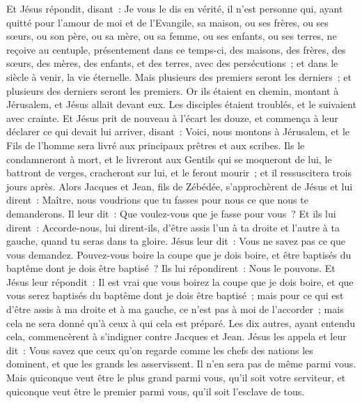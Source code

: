 \begin{multicols}{2}
Et Jésus répondit, disant~: Je vous le dis en vérité, il n'est personne qui, ayant quitté pour l'amour de moi et de l'Evangile, sa maison, ou ses frères, ou ses sœurs, ou son père, ou sa mère, ou sa femme, ou ses enfants, ou ses terres,
ne reçoive au centuple, présentement dans ce temps-ci, des maisons, des frères, des sœurs, des mères, des enfants, et des terres, avec des persécutions~; et dans le siècle à venir, la vie éternelle.
Mais plusieurs des premiers seront les derniers~; et plusieurs des derniers seront les premiers.
Or ils étaient en chemin, montant à Jérusalem, et Jésus allait devant eux. Les disciples étaient troublés, et le suivaient avec crainte. Et Jésus prit de nouveau à l'écart les douze, et commença à leur déclarer ce qui devait lui arriver,
disant~: Voici, nous montons à Jérusalem, et le Fils de l'homme sera livré aux principaux prêtres et aux scribes. Ils le condamneront à mort, et le livreront aux Gentils
qui se moqueront de lui, le battront de verges, cracheront sur lui, et le feront mourir~; et il ressuscitera trois jours après.
Alors Jacques et Jean, fils de Zébédée, s'approchèrent de Jésus et lui dirent~: Maître, nous voudrions que tu fasses pour nous ce que nous te demanderons.
Il leur dit~: Que voulez-vous que je fasse pour vous~?
Et ils lui dirent~: Accorde-nous, lui dirent-ils, d'être assis l'un à ta droite et l'autre à ta gauche, quand tu seras dans ta gloire.
Jésus leur dit~: Vous ne savez pas ce que vous demandez. Pouvez-vous boire la coupe que je dois boire, et être baptisés du baptême dont je dois être baptisé~?
Ils lui répondirent~: Nous le pouvons. Et Jésus leur répondit~: Il est vrai que vous boirez la coupe que je dois boire, et que vous serez baptisés du baptême dont je dois être baptisé~;
mais pour ce qui est d'être assis à ma droite et à ma gauche, ce n'est pas à moi de l'accorder~; mais cela ne sera donné qu'à ceux à qui cela est préparé.
Les dix autres, ayant entendu cela, commencèrent à s'indigner contre Jacques et Jean.
Jésus les appela et leur dit~: Vous savez que ceux qu'on regarde comme les chefs des nations les dominent, et que les grands les asservissent.
Il n'en sera pas de même parmi vous. Mais quiconque veut être le plus grand parmi vous, qu'il soit votre serviteur,
et quiconque veut être le premier parmi vous, qu'il soit l'esclave de tous.

\end{multicols}
